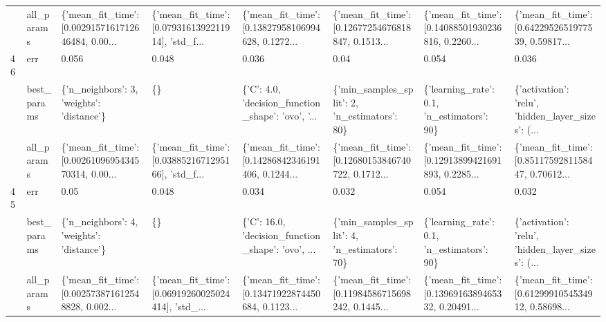 \begin{tabular}{llllllll}
   & all\_params &  \{'mean\_fit\_time': [0.0029157161712646484, 0.00... &  \{'mean\_fit\_time': [0.0793161392211914], 'std\_f... &  \{'mean\_fit\_time': [0.13827958106994628, 0.1272... &  \{'mean\_fit\_time': [0.12677254676818847, 0.1513... &  \{'mean\_fit\_time': [0.14088501930236816, 0.2260... &  \{'mean\_fit\_time': [0.6422952651977539, 0.59817... \\
46 & err &                                              0.056 &                                              0.048 &                                              0.036 &                                               0.04 &                                              0.054 &                                              0.036 \\
   & best\_params &          \{'n\_neighbors': 3, 'weights': 'distance'\} &                                                 \{\} &  \{'C': 4.0, 'decision\_function\_shape': 'ovo', '... &       \{'min\_samples\_split': 2, 'n\_estimators': 80\} &         \{'learning\_rate': 0.1, 'n\_estimators': 90\} &  \{'activation': 'relu', 'hidden\_layer\_sizes': (... \\
   & all\_params &  \{'mean\_fit\_time': [0.0026109695434570314, 0.00... &  \{'mean\_fit\_time': [0.0388521671295166], 'std\_f... &  \{'mean\_fit\_time': [0.14286842346191406, 0.1244... &  \{'mean\_fit\_time': [0.12680153846740722, 0.1712... &  \{'mean\_fit\_time': [0.12913899421691893, 0.2285... &  \{'mean\_fit\_time': [0.8511759281158447, 0.70612... \\
45 & err &                                               0.05 &                                              0.048 &                                              0.034 &                                              0.032 &                                              0.054 &                                              0.032 \\
   & best\_params &          \{'n\_neighbors': 4, 'weights': 'distance'\} &                                                 \{\} &  \{'C': 16.0, 'decision\_function\_shape': 'ovo', ... &       \{'min\_samples\_split': 4, 'n\_estimators': 70\} &         \{'learning\_rate': 0.1, 'n\_estimators': 90\} &  \{'activation': 'relu', 'hidden\_layer\_sizes': (... \\
   & all\_params &  \{'mean\_fit\_time': [0.002573871612548828, 0.002... &  \{'mean\_fit\_time': [0.06919260025024414], 'std\_... &  \{'mean\_fit\_time': [0.13471922874450684, 0.1123... &  \{'mean\_fit\_time': [0.11984586715698242, 0.1445... &  \{'mean\_fit\_time': [0.1396916389465332, 0.20491... &  \{'mean\_fit\_time': [0.6129991054534912, 0.58698... \\

\end{tabular}
